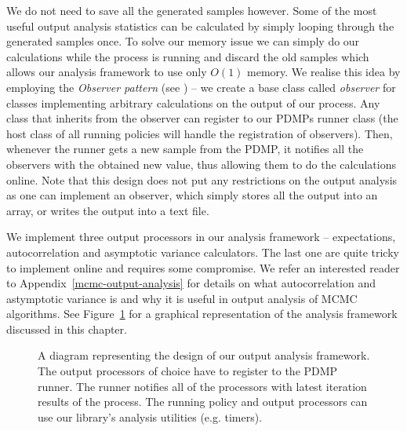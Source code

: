 \documentclass[report.tex]{subfiles}
\begin{document}
We do not need to save all the generated samples however. Some of the most useful
output analysis statistics can be calculated by simply looping through the generated samples
once. To solve our memory issue we can simply do our calculations while the process is running
and discard the old samples which allows our analysis framework to use only $O(1)$ memory.
We realise this idea by employing the \textit{Observer pattern} (see \citet{gamma1994design})
-- we create a base class called \textit{observer} for classes implementing arbitrary
calculations on the output of our process. Any class that inherits from the observer can register
to our PDMPs runner class (the host class of all running policies will handle the registration of observers).
Then, whenever the runner gets a new sample from the PDMP, it notifies all the observers
with the obtained new value, thus allowing them to do the calculations online.
Note that this design does not put any restrictions on the output analysis as one can implement
an observer, which simply stores all the output into an array, or writes the output into
a text file.

We implement three output processors in our analysis framework -- expectations, autocorrelation
and asymptotic variance calculators. The last one are quite tricky to implement online
and requires some compromise. We refer an interested reader to Appendix~\ref{mcmc-output-analysis}
for details on what autocorrelation and astymptotic variance is and why it
is useful in output analysis of MCMC algorithms.
See Figure~\ref{figure-analysis-framework-design} for a graphical representation
of the analysis framework discussed in this chapter.

\begin{figure}
  \captionsetup{skip=1.25cm}
  \centering
  \def\svgwidth{\linewidth}
  
  \caption{A diagram representing the design of our output analysis framework.
           The output processors of choice have to register to the PDMP runner.
           The runner notifies all of the processors with latest iteration results of the process.
           The running policy and output processors can use our library's analysis utilities (e.g. timers).}
  \label{figure-analysis-framework-design}
\end{figure}
\end{document}
